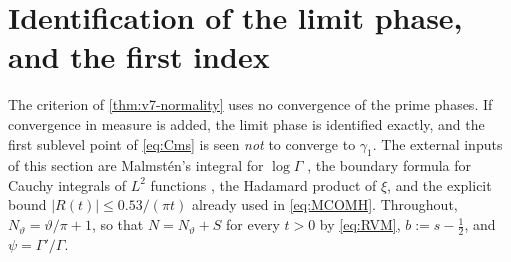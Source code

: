 \documentclass[11pt,a4paper]{article}
\numberwithin{equation}{section}
\theoremstyle{definition}
\theoremstyle{remark}
\begin{document}
\section{Identification of the limit phase, and the first index}
\label{sec:v8-limit}
The criterion of \cref{thm:v7-normality} uses no convergence of the
prime phases. If convergence in measure is added, the limit phase is
identified exactly, and the first sublevel point of \eqref{eq:Cms} is
seen \emph{not} to converge to $\gamma_1$. The external inputs of this
section are Malmst\'en's integral for $\log\Gamma$
\cite[\S12.31]{WhittakerWatson}, the boundary formula for Cauchy
integrals of $L^2$ functions \cite[Thm.~93]{TitchmarshFI}, the Hadamard
product of $\xi$, and the explicit bound $|R(t)|\le0.53/(\pi t)$
already used in \eqref{eq:MCOMH}. Throughout, $N_\vartheta=\vartheta/\pi+1$,
so that $N=N_\vartheta+S$ for every $t>0$ by \eqref{eq:RVM}, $b:=s-\frac12$,
and $\psi=\Gamma'/\Gamma$.
\end{document}
